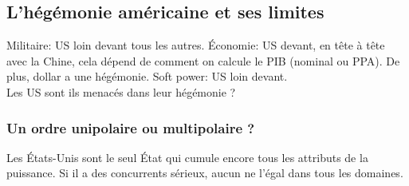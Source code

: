 \documentclass[10pt, a4paper, openany]{book}
\begin{document}
\subsection{L'hégémonie américaine et ses limites}

Militaire: US loin devant tous les autres. Économie: US devant, en tête à tête avec la Chine, cela dépend de comment on calcule le PIB (nominal ou PPA). De plus, dollar a une hégémonie. Soft power: US loin devant. \\
Les US sont ils menacés dans leur hégémonie ? 

\subsubsection{Un ordre unipolaire ou multipolaire ?}

Les États-Unis sont le seul État qui cumule encore tous les attributs de la puissance. Si il a des concurrents sérieux, aucun ne l'égal dans tous les domaines. 
\end{document}
